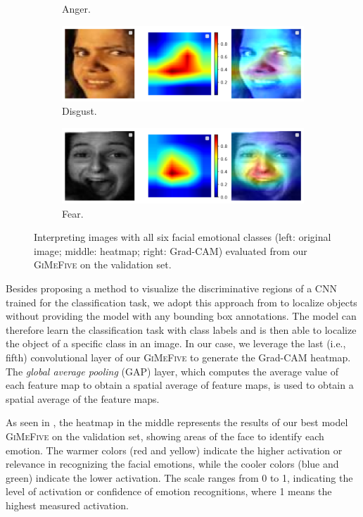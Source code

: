 \begin{figure}[ht]
\begin{subfigure}{0.47\linewidth}
    \caption{Anger.}
    \label{fig:xai4}
  \end{subfigure}
  \hfill
  \begin{subfigure}{0.47\linewidth}
    \includegraphics[width=\linewidth]{xai_disgust.png}
    \caption{Disgust.}
    \label{fig:xai5}
  \end{subfigure}
  \hfill
  \begin{subfigure}{0.47\linewidth}
    \includegraphics[width=\linewidth]{xai_fear.png}
    \caption{Fear.}
    \label{fig:xai6}
  \end{subfigure}
  \caption{Interpreting images with all six facial emotional classes (left: original image; middle: heatmap; right: Grad-CAM) evaluated from our \textsc{GiMeFive} on the validation set.}
  \label{fig:xai}
\end{figure}

Besides proposing a method to visualize the discriminative regions of a CNN trained for the classification task, 
we adopt this approach from \citet{ZhouKLOT16} to localize objects without providing the model with any bounding box annotations. 
The model can therefore learn the classification task with class labels and is then able to localize the object of a specific class in an image. 
In our case, we leverage the last (i.e., fifth) convolutional layer of our \textsc{GiMeFive} to generate the Grad-CAM heatmap. 
The \textit{global average pooling} (GAP) layer, 
which computes the average value of each feature map to obtain a spatial average of feature maps, 
is used to obtain a spatial average of the feature maps. 

As seen in , 
the heatmap in the middle represents the results of our best model \textsc{GiMeFive} on the validation set, 
showing areas of the face to identify each emotion. 
The warmer colors (red and yellow) indicate the higher activation or relevance in recognizing the facial emotions, 
while the cooler colors (blue and green) indicate the lower activation. 
The scale ranges from 0 to 1, 
indicating the level of activation or confidence of emotion recognitions,
where 1 means the highest measured activation. 

